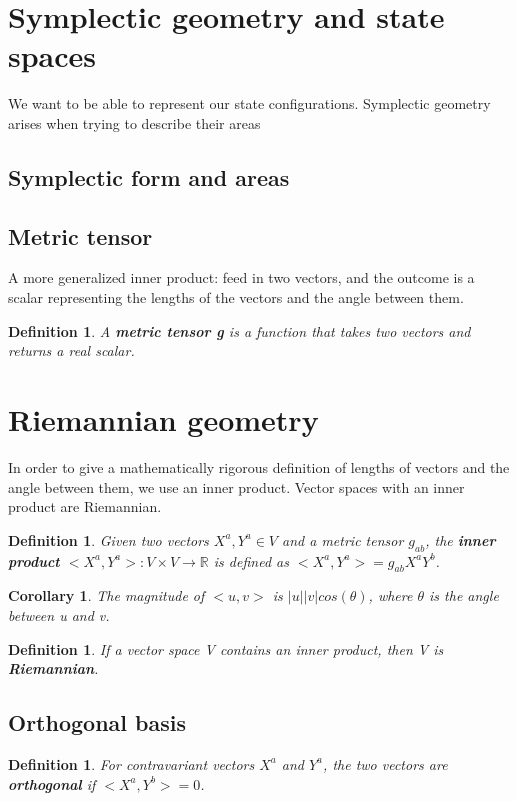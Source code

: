 \documentclass{book}
\newtheorem{defn}[equation]{Definition}
\newtheorem{coro}[equation]{Corollary}
\begin{document}
\section{Symplectic geometry and state spaces}
We want to be able to represent our state configurations. Symplectic geometry arises when trying to describe their areas

\subsection{Symplectic form and areas}



\subsection{Metric tensor}
A more generalized inner product: feed in two vectors, and the outcome is a scalar representing the lengths of the vectors and the angle between them. 

\begin{defn}
	A \textbf{metric tensor g} is a function that takes two vectors and returns a real scalar. 
\end{defn}


\section{Riemannian geometry}
In order to give a mathematically rigorous definition of lengths of vectors and the angle between them, we use an inner product. Vector spaces with an inner product are Riemannian.

\begin{defn}
	Given two vectors $X^a,Y^a \in V$ and a metric tensor $g_{ab}$, the \textbf{inner product} $<X^a,Y^a> : V \times V \to \mathbb{R}$ is defined as $<X^a,Y^a> = g_{ab}X^aY^b$. 
\end{defn}

\begin{coro}
	The magnitude of $<u,v>$ is $|u||v|cos(\theta)$, where $\theta$ is the angle between u and v. 
\end{coro}

\begin{defn}
	If a vector space V contains an inner product, then V is \textbf{Riemannian}.
	\end{defn}



\subsection{Orthogonal basis}

\begin{defn}
	For contravariant vectors $X^a$ and $Y^a$, the two vectors are \textbf{orthogonal} if $<X^a,Y^b> = 0$. 
\end{defn}
\end{document}
